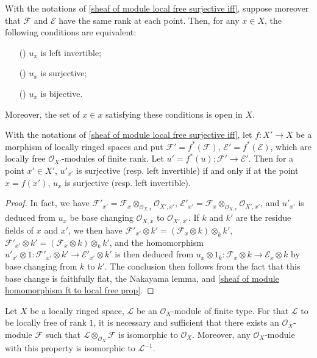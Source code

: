 \begin{corollary}\label{sheaf of module local free same rank inj iff bij}
With the notations of \cref{sheaf of module local free surjective iff}, suppose moreover that $\mathscr{F}$ and $\mathscr{E}$ have the same rank at each point. Then, for any $x\in X$, the following conditions are equivalent:
\begin{itemize}
\item[(\rmnum{1})] $u_x$ is left invertible;
\item[(\rmnum{2})] $u_x$ is surjective;
\item[(\rmnum{3})] $u_x$ is bijective.
\end{itemize}
Moreover, the set of $x\in x$ satisfying these conditions is open in $X$.
\end{corollary}
\begin{corollary}\label{sheaf of module local free same rank sur of inverse image}
With the notations of \cref{sheaf of module local free surjective iff}, let $f:X'\to X$ be a morphism of locally ringed spaces and put $\mathscr{F}'=f^*(\mathscr{F})$, $\mathscr{E}'=f^*(\mathscr{E})$, which are locally free $\mathscr{O}_{X'}$-modules of finite rank. Let $u'=f^*(u):\mathscr{F}'\to\mathscr{E}'$. Then for a point $x'\in X'$, $u'_{x'}$ is surjective (resp. left invertible) if and only if at the point $x=f(x')$, $u_x$ is surjective (resp. left invertible).
\end{corollary}
\begin{proof}
In fact, we have $\mathscr{F}'_{x'}=\mathscr{F}_x\otimes_{\mathscr{O}_{X,x}}\mathscr{O}_{X',x'}$, $\mathscr{E}'_{x'}=\mathscr{F}_x\otimes_{\mathscr{O}_{X,x}}\mathscr{O}_{X',x'}$, and $u'_{x'}$ is deduced from $u_x$ be base changing $\mathscr{O}_{X,x}$ to $\mathscr{O}_{X',x'}$. If $k$ and $k'$ are the residue fields of $x$ and $x'$, we then have $\mathscr{F}'_{x'}\otimes k'=(\mathscr{F}_x\otimes k)\otimes_kk'$, $\mathscr{F}'_{x'}\otimes k'=(\mathscr{F}_x\otimes k)\otimes_kk'$, and the homomorphism $u'_{x'}\otimes 1:\mathscr{F}'_{x'}\otimes k'\to\mathscr{E}'_{x'}\otimes k'$ is then deduced from $u_x\otimes 1_k:\mathscr{F}_x\otimes k\to\mathscr{E}_x\otimes k$ by base changing from $k$ to $k'$. The conclusion then follows from the fact that this base change is faithfully flat, the Nakayama lemma, and \cref{sheaf of module homomorphism ft to local free prop}. 
\end{proof}
\begin{proposition}\label{sheaf of module local rank 1 iff invertible}
Let $X$ be a locally ringed space, $\mathscr{L}$ be an $\mathscr{O}_X$-module of finite type. For that $\mathscr{L}$ to be locally free of rank $1$, it is necessary and sufficient that there exists an $\mathscr{O}_X$-module $\mathscr{F}$ such that $\mathscr{L}\otimes_{\mathscr{O}_X}\mathscr{F}$ is isomorphic to $\mathscr{O}_X$. Moreover, any $\mathscr{O}_X$-module with this property is isomorphic to $\mathscr{L}^{-1}$.
\end{proposition}
